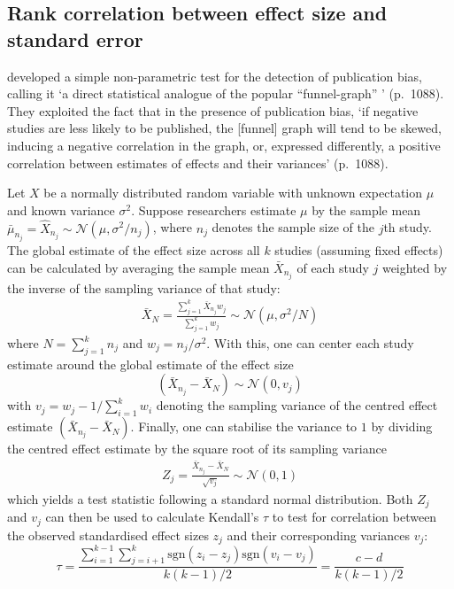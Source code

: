 \subsection{Rank correlation between effect size and standard error}
\citet{begg_operating_1994} developed a simple non-parametric test for the detection of publication bias, calling it `a direct statistical analogue of the popular ``funnel-graph'' ' (p.~1088). They exploited the fact that in the presence of publication bias, `if negative studies are less likely to be published, the [funnel] graph will tend to be skewed, inducing a negative correlation in the graph, or, expressed differently, a positive correlation between estimates of effects and their variances' (p.~1088).\par
Let $X$ be a normally distributed random variable with unknown expectation $\mu$ and known variance $\sigma^2$. Suppose researchers estimate $\mu$ by the sample mean $\bar{\mu}_{n_j} = \hat{X}_{n_j} \sim \mathcal{N}(\mu, \sigma^2/n_j)$, where $n_j$ denotes the sample size of the $j$th study. The global estimate of the effect size across all $k$ studies (assuming fixed effects) can be calculated by averaging the sample mean $\bar{X}_{n_j}$ of each study $j$ weighted by the inverse of the sampling variance of that study:
\begin{align}
    \bar{X}_N = \frac{\sum_{j=1}^k \bar{X}_{n_j}w_j}{\sum_{j=1}^k w_j} \sim \mathcal{N}(\mu,\sigma^2/N) \label{eq:global_estimator_precision_weight}
\end{align}
where $N = \sum_{j=1}^k n_j$ and $w_j = n_j/\sigma^2$. With this, one can center each study estimate around the global estimate of the effect size
$$(\bar{X}_{n_j}-\bar{X}_N) \sim \mathcal{N}(0, v_j)$$
with $v_j = w_j - 1/\sum_{i=1}^k w_i$ denoting the sampling variance of the centred effect estimate $(\bar{X}_{n_j}-\bar{X}_N)$. Finally, one can stabilise the variance to $1$ by dividing the centred effect estimate by the square root of its sampling variance
\begin{align}
    Z_j = \frac{\bar{X}_{n_j}-\bar{X}_N}{\sqrt{v_j}} \sim \mathcal{N}(0, 1) \label{eq:standardised_effect_size}
\end{align}
which yields a test statistic following a standard normal distribution. Both  $Z_j$ and $v_j$ can then be used to calculate Kendall's $\tau$ \citep{kendall_new_1938} to test for correlation between the observed standardised effect sizes $z_j$ and their corresponding variances $v_j$:
$$\tau = \frac{\sum_{i=1}^{k-1}\sum_{j=i+1}^k \text{sgn}(z_i-z_j)\text{sgn}(v_i-v_j)}{k(k-1)/2} = \frac{c-d}{k(k-1)/2}$$
